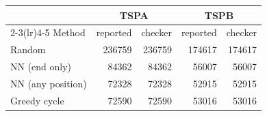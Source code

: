 \begin{tabular}{lrrrr}
\toprule
 & \multicolumn{2}{c}{TSPA} & \multicolumn{2}{c}{TSPB} \\
\cmidrule(lr){2-3}\cmidrule(lr){4-5}
Method & reported & checker & reported & checker \\
\midrule
Random & 236759 & 236759 & 174617 & 174617 \\
NN (end only) & 84362 & 84362 & 56007 & 56007 \\
NN (any position) & 72328 & 72328 & 52915 & 52915 \\
Greedy cycle & 72590 & 72590 & 53016 & 53016 \\
\bottomrule
\end{tabular}
